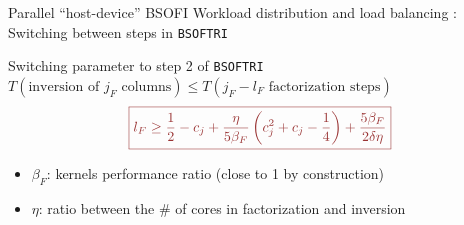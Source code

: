 \documentclass[xcolor=table,final]{beamer} %
\newcommand{\Bsoftri}{\texttt{BSOFTRI}\xspace}
\begin{document}
\begin{frame}{Parallel ``host-device'' BSOFI}{%
    Workload distribution and load balancing : Switching between steps in \Bsoftri}

  \begin{block}{Switching parameter to step 2 of \Bsoftri}
    $  
    T(\text{inversion of $j_F$ columns})
    \le T(\text{$j_F-l_F$ factorization steps})
    $
  \[\color{red!50!black!80}{\fbox{$\displaystyle
      l_{F} \ge
      \frac{1}{2} - c_{j} + \frac{\eta}{5 \beta_F } 
      \left( c_{j}^{2} + c_{j}  - \frac{1}{4} \right) + 
      \frac{5 \beta_F }{2 \delta \eta}
      $}}\]
  \begin{itemize}
  \item $\beta_F$: kernels performance ratio (close to 1 by construction)
  \item $\eta$: ratio between the \# of cores 
    in factorization and inversion
  \end{itemize}
  \end{block}

  \begin{columns}
    \begin{column}{0.5\textwidth}
      \centering
    \end{column}
    \begin{column}{0.5\textwidth}
      \centering
    \end{column}
  \end{columns}
\end{frame}
\end{document}

